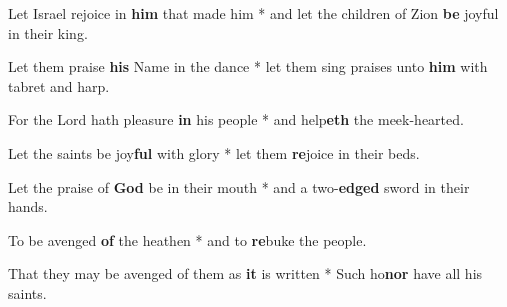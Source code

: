 \begin{multicols}{2}
	Let Israel rejoice in \textbf{him} that made him * and let the children of Zion \textbf{be} joyful in their king.
	
	Let them praise \textbf{his} Name in the dance * let them sing praises unto \textbf{him} with tabret and harp.
	
	For the Lord hath pleasure \textbf{in} his people * and help\textbf{eth} the meek-hearted.
	
	Let the saints be joy\textbf{ful} with glory * let them \textbf{re}joice in their beds.
	
	Let the praise of \textbf{God} be in their mouth * and a two-\textbf{edged} sword in their hands.
	
	To be avenged \textbf{of} the heathen * and to \textbf{re}buke the people.
	
	That they may be avenged of them as \textbf{it} is written * Such ho\textbf{nor} have all his saints.
\end{multicols}